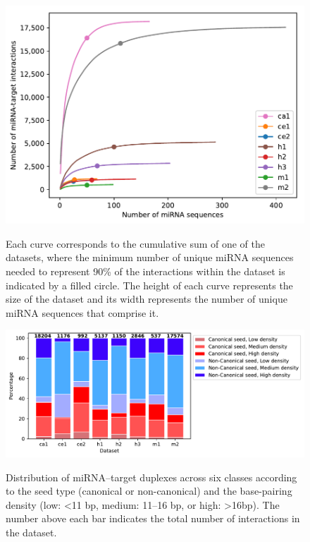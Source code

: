\documentclass{bmcart}
\begin{document}
\begin{backmatter}
\begin{figure}[h!]
  \caption{}
      \includegraphics[width=\textwidth]{1_mirna_dist.pdf}
      \label{fig:datasetplot}
      \caption*{Each curve corresponds to the cumulative sum of one of the datasets, where the minimum number of unique miRNA sequences needed to represent 90\% of the interactions within the dataset is indicated by a filled circle. The height of each curve represents the size of the dataset and its width represents the number of unique miRNA sequences that comprise it.}
      \end{figure}

\begin{figure}[h!]
  \caption{} 
    \includegraphics[width=\textwidth]{2_seed_type_positive2.pdf}
      \label{fig:seed_type_pos}
      \caption*{Distribution of miRNA--target duplexes across six classes according to the seed type (canonical or non-canonical) and the base-pairing density (low: \textless 11 bp, medium: 11--16 bp, or high: \textgreater 16bp). The number above each bar indicates the total number of interactions in the dataset.}
      \end{figure}


\end{backmatter}
\end{document}

